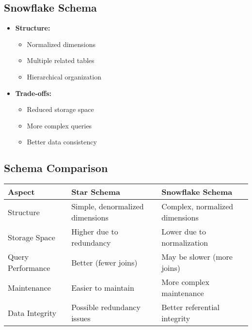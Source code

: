 \subsection{Snowflake Schema}
\bigskip


\begin{itemize}
    \item \textbf{Structure:}
        \begin{itemize}
            \item Normalized dimensions
            \item Multiple related tables
            \item Hierarchical organization
        \end{itemize}
    \item \textbf{Trade-offs:}
        \begin{itemize}
            \item Reduced storage space
            \item More complex queries
            \item Better data consistency
        \end{itemize}
\end{itemize}

\subsection{Schema Comparison}
\begin{center}
\begin{tabular}{|p{3cm}|p{5.5cm}|p{5.5cm}|}
    \hline
    \textbf{Aspect} & \textbf{Star Schema} & \textbf{Snowflake Schema} \\
    \hline
    Structure & Simple, denormalized dimensions & Complex, normalized dimensions \\
    \hline
    Storage Space & Higher due to redundancy & Lower due to normalization \\
    \hline
    Query Performance & Better (fewer joins) & May be slower (more joins) \\
    \hline
    Maintenance & Easier to maintain & More complex maintenance \\
    \hline
    Data Integrity & Possible redundancy issues & Better referential integrity \\
    \hline
\end{tabular}
\end{center}